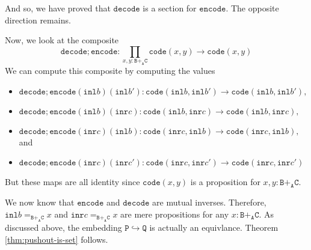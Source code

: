 \documentclass[12pt]{amsart}
\newcommand{\from}{\colon}
\newcommand{\type}[1]{\mathtt{#1}}
\newcommand{\tin}{\colon}
\newcommand{\A}{\type{A}}
\newcommand{\B}{\type{B}}
\newcommand{\C}{\type{C}}
\renewcommand{\P}{\type{P}}
\newcommand{\Q}{\type{Q}}
\newcommand{\BAC}{\B +_{\A} \C}
\newcommand{\inl}{\type{inl}}
\newcommand{\inr}{\type{inr}}
\newcommand{\code}{\type{code}}
\newcommand{\encode}{\type{encode}}
\newcommand{\decode}{\type{decode}}
\theoremstyle{remark}
\theoremstyle{definition}
\begin{document}
And so, we have proved that \( \decode \) is a section for \( \encode
\). The opposite direction remains.


Now, we look at the composite
\[
  \decode ; \encode \from
  \prod\limits_{x,y \tin \BAC} \code ( x,y ) \to
  \code ( x,y )
\]
We can compute this composite by computing the values
%
\begin{itemize}
\item
  \(
    \decode ; \encode (\inl b ) ( \inl b' ) \from
    \code ( \inl b , \inl b' ) \to
    \code ( \inl b , \inl b' ),
  \)
\item
  \(
    \decode ; \encode (\inl b ) ( \inr c ) \from
    \code ( \inl b , \inr c ) \to
    \code ( \inl b , \inr c ),
  \)
\item
  \(
    \decode ; \encode (\inr c ) ( \inl b ) \from
    \code ( \inr c , \inl b ) \to
    \code ( \inr c , \inl b ),
    \)
  and  
\item
  \(
    \decode ; \encode (\inr c ) ( \inr c' ) \from
    \code ( \inr c , \inr c' ) \to
    \code ( \inr c , \inr c' )
  \)
\end{itemize}
%
But these maps are all identity since \( \code (x,y) \) is a
proposition for \( x , y \tin \BAC \).   
\par


We now know that
% 
\(
    \encode
\)
%
and
%
\(
    \decode
\)
% 
are mutual inverses. Therefore,
% 
\(
    \inl b =_{ \BAC  } x
\)
% 
and
%
\(
    \inr c =_{ \BAC } x
\)
% 
are mere propositions for any
%
\(
    x \tin \BAC.
\)
% 
As discussed above, the embedding
% 
\(
    \P \hookrightarrow \Q
\)
%
is actually an equivlance. Theorem \ref{thm:pushout-is-set} follows.


\end{document}
